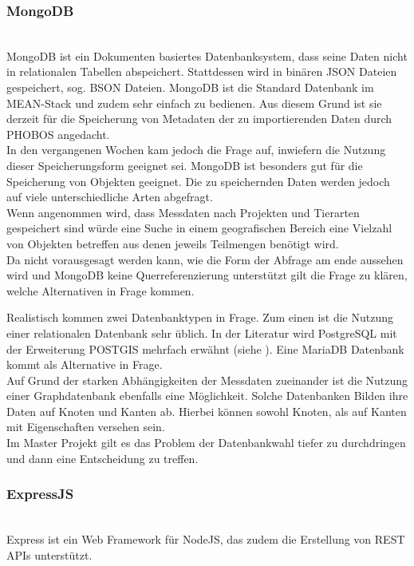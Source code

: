 \documentclass[10pt,conference,compsocconf]{IEEEtran}
\begin{document}
\subsubsection{MongoDB}\hspace*{\fill} \\
MongoDB ist ein Dokumenten basiertes Datenbanksystem, dass seine Daten nicht in relationalen Tabellen abspeichert. Stattdessen wird in binären JSON Dateien gespeichert, sog. BSON Dateien. MongoDB ist die Standard Datenbank im MEAN-Stack und zudem sehr einfach zu bedienen. Aus diesem Grund ist sie derzeit für die Speicherung von Metadaten der zu importierenden Daten durch PHOBOS angedacht.\\
In den vergangenen Wochen kam jedoch die Frage auf, inwiefern die Nutzung dieser Speicherungsform geeignet sei. MongoDB ist besonders gut für die Speicherung von Objekten geeignet. Die zu speichernden Daten werden jedoch auf viele unterschiedliche Arten abgefragt.\\
Wenn angenommen wird, dass Messdaten nach Projekten und Tierarten gespeichert sind würde eine Suche in einem geografischen Bereich eine Vielzahl von Objekten betreffen aus denen jeweils Teilmengen benötigt wird.\\
Da nicht vorausgesagt werden kann, wie die Form der Abfrage am ende aussehen wird und MongoDB keine Querreferenzierung unterstützt gilt die Frage zu klären, welche Alternativen in Frage kommen.\par

Realistisch kommen zwei Datenbanktypen in Frage. Zum einen ist die Nutzung einer relationalen Datenbank sehr üblich. In der Literatur wird PostgreSQL mit der Erweiterung POSTGIS mehrfach erwähnt (siehe \cite{wms_flow_mapping} \cite{waldbiomasse}). Eine MariaDB Datenbank kommt als Alternative in Frage.\\
Auf Grund der starken Abhängigkeiten der Messdaten zueinander ist die Nutzung einer Graphdatenbank ebenfalls eine Möglichkeit. Solche Datenbanken Bilden ihre Daten auf Knoten und Kanten ab. Hierbei können sowohl Knoten, als auf Kanten mit Eigenschaften versehen sein.\\
Im Master Projekt gilt es das Problem der Datenbankwahl tiefer zu durchdringen und dann eine Entscheidung zu treffen.\vspace{.5em}

\subsubsection{ExpressJS}\hspace*{\fill} \\
Express ist ein Web Framework für NodeJS, das zudem die Erstellung von REST APIs unterstützt.\vspace{.5em}
\end{document}
